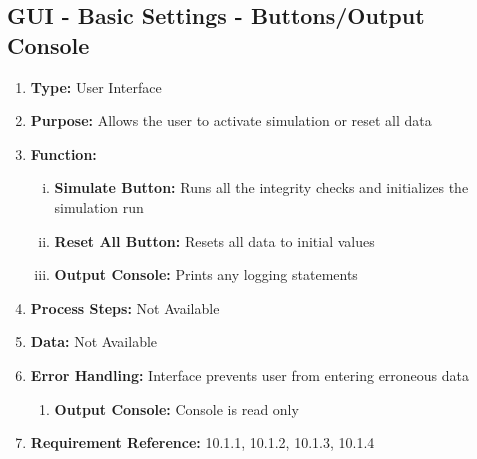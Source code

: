 \documentclass[paper=letter, fontsize=10pt]{scrartcl}
\numberwithin{equation}{section}		%
\numberwithin{figure}{section}			%
\numberwithin{table}{section}				%
\begin{document}
\subsection{GUI - Basic Settings - Buttons/Output Console}
\begin{enumerate}[]
	\item \textbf{Type:} User Interface
	\item \textbf{Purpose:} Allows the user to activate simulation or reset all data
	\item \textbf{Function:} 
	\begin{enumerate}[(i)]
		\item \textbf{Simulate Button:} Runs all the integrity checks and initializes the simulation run
		\item \textbf{Reset All Button:} Resets all data to initial values
		\item \textbf{Output Console:} Prints any logging statements
	\end{enumerate}
	\item \textbf{Process Steps:} Not Available
	\item \textbf{Data:} Not Available
	\item \textbf{Error Handling:} Interface prevents user from entering erroneous data 
	\begin{enumerate}[]
		\item \textbf{Output Console:} Console is read only
	\end{enumerate}
	\item \textbf{Requirement Reference:} 10.1.1, 10.1.2, 10.1.3, 10.1.4
\end{enumerate}
\end{document}
